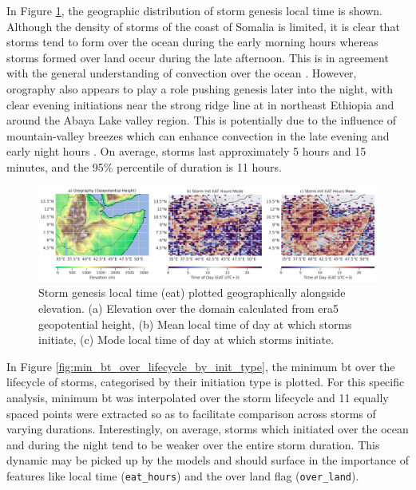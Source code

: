 In Figure \ref{fig:orography_storm_init_eat_hours_mode_mean}, the geographic distribution of storm genesis local time is shown. Although the density of storms of the coast of Somalia is limited, it is clear that storms tend to form over the ocean during the early morning hours whereas storms formed over land occur during the late afternoon. This is in agreement with the general understanding of convection over the ocean \citep{Hall1999,Houze2004}. However, orography also appears to play a role pushing genesis later into the night, with clear evening initiations near the strong ridge line at  in northeast Ethiopia and around the Abaya Lake valley region. This is potentially due to the influence of mountain-valley breezes which can enhance convection in the late evening and early night hours \citep{Zardi2013}. On average, storms last approximately 5 hours and 15 minutes, and the 95\% percentile of duration is 11 hours.

\begin{figure}[ht]
    \centering
    \includegraphics[width=\textwidth]{../figures/generated/exploration/orography_storm_init_eat_hours_mode_mean.png}
    \caption{Storm genesis local time (\acrlong{eat}) plotted geographically alongside elevation. (a) Elevation over the domain calculated from \acrshort{era5} geopotential height, (b) Mean local time of day at which storms initiate, (c) Mode local time of day at which storms initiate.}
    \label{fig:orography_storm_init_eat_hours_mode_mean}
\end{figure}

In Figure \ref{fig:min_bt_over_lifecycle_by_init_type}, the minimum \acrfull{bt} over the lifecycle of storms, categorised by their initiation type is plotted. For this specific analysis, minimum \acrshort{bt} was interpolated over the storm lifecycle and 11 equally spaced points were extracted so as to facilitate comparison across storms of varying durations. Interestingly, on average, storms which initiated over the ocean and during the night tend to be weaker over the entire storm duration. This dynamic may be picked up by the models and should surface in the importance of features like local time (\texttt{eat\_hours}) and the over land flag (\texttt{over\_land}). 

